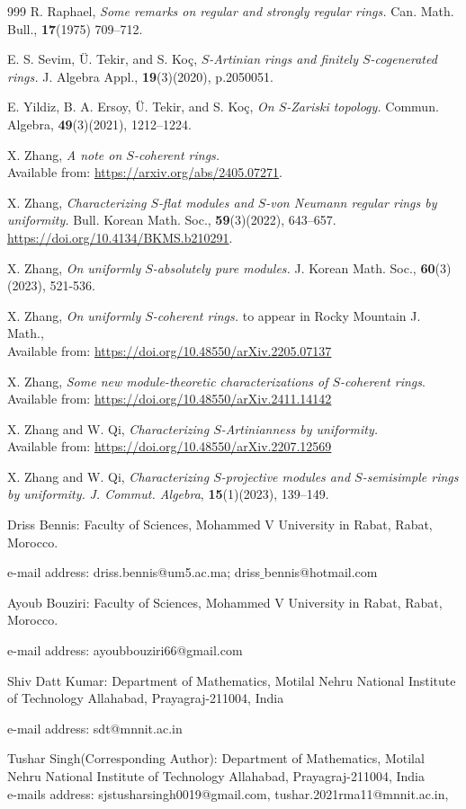 \documentclass[12pt]{article}
\begin{document}
\begin{thebibliography}{999}
 R. Raphael, \textit{Some remarks on regular and strongly regular rings.} Can. Math. Bull., \textbf{17}(1975) 709–712.


 E. S. Sevim, Ü. Tekir, and S. Koç, \textit{$S$-Artinian rings and finitely $S$-cogenerated rings.} J. Algebra Appl., \textbf{19}(3)(2020), p.2050051.

 E. Yildiz, B. A. Ersoy, Ü. Tekir, and S. Koç, \textit{On $S$-Zariski topology.} Commun. Algebra, \textbf{49}(3)(2021), 1212–1224.


 X. Zhang, \textit{A note on $S$-coherent rings.} \\Available from: \url{https://arxiv.org/abs/2405.07271}.


 X. Zhang, \textit{Characterizing $S$-flat modules and $S$-von Neumann regular rings by uniformity.} Bull. Korean Math. Soc., \textbf{59}(3)(2022), 643–657.   \url{https://doi.org/10.4134/BKMS.b210291}.

 X. Zhang, \textit{On uniformly $S$-absolutely pure modules.}  J. Korean Math. Soc., \textbf{60}(3)(2023), 521-536.

 X. Zhang, \textit{On uniformly $S$-coherent rings.} to appear in Rocky Mountain J. Math., \\ Available from: \url{https://doi.org/10.48550/arXiv.2205.07137}

 X. Zhang,  \textit{Some new module-theoretic characterizations of $ S $-coherent rings}.\\  Available from: \url{https://doi.org/10.48550/arXiv.2411.14142 }

 X. Zhang and W. Qi,  \textit{Characterizing $S$-Artinianness by uniformity.} \\Available from: \url{https://doi.org/10.48550/arXiv.2207.12569}

 X. Zhang and W. Qi, \textit{Characterizing $S$-projective modules and $S$-semisimple rings by uniformity.} \textit{J. Commut. Algebra}, \textbf{15}(1)(2023), 139–149.

\end{thebibliography}


Driss Bennis:  Faculty of Sciences, Mohammed V University in Rabat, Rabat, Morocco.

\noindent e-mail address: driss.bennis@um5.ac.ma; driss$\_$bennis@hotmail.com

Ayoub Bouziri: Faculty of Sciences, Mohammed V University in Rabat, Rabat, Morocco.

\noindent e-mail address: ayoubbouziri66@gmail.com

Shiv Datt Kumar: Department of Mathematics, Motilal Nehru National Institute of Technology Allahabad, Prayagraj-211004, India

\noindent e-mail address: sdt@mnnit.ac.in

Tushar Singh(Corresponding Author): Department of Mathematics, Motilal Nehru National Institute of Technology Allahabad, Prayagraj-211004, India\\
\noindent e-mails address: sjstusharsingh0019@gmail.com, tushar.2021rma11@mnnit.ac.in, 
\end{document}
